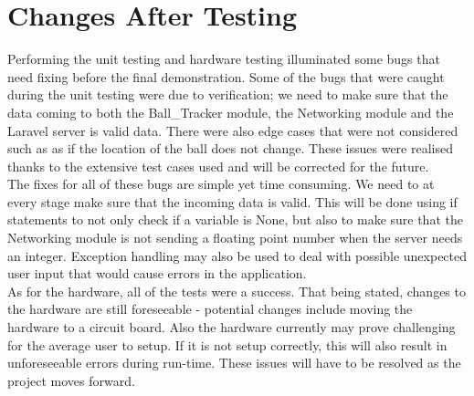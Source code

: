 \chapter{Changes After Testing}

\setlength{\parindent}{0cm}

Performing the unit testing and hardware testing illuminated some bugs that need fixing before the final demonstration. Some of the bugs that were caught during the unit testing were due to verification; we need to make sure that the data coming to both the Ball\_Tracker module, the Networking module and the Laravel server is valid data. There were also edge cases that were not considered such as as if the location of the ball does not change. These issues were realised thanks to the extensive test cases used and will be corrected for the future. 
\\

The fixes for all of these bugs are simple yet time consuming. We need to at every stage make sure that the incoming data is valid. This will be done using if statements to not only check if a variable is None, but also to make sure that the Networking module is not sending a floating point number when the server needs an integer. Exception handling may also be used to deal with possible unexpected user input that would cause errors in the application. 
\\

As for the hardware, all of the tests were a success. That being stated, changes to the hardware are still foreseeable - potential changes include moving the hardware to a circuit board. Also the hardware currently may prove challenging for the average user to setup. If it is not setup correctly, this will also result in unforeseeable errors during run-time. These issues will have to be resolved as the project moves forward. 